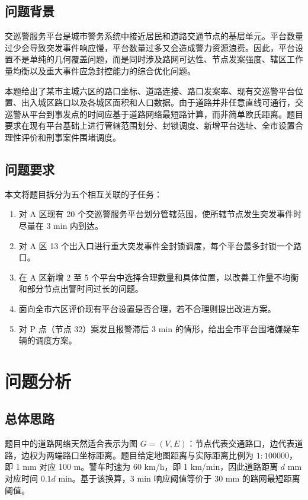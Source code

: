 \documentclass[UTF8,a4paper,12pt]{ctexart}
\begin{document}
\subsection{问题背景}
交巡警服务平台是城市警务系统中接近居民和道路交通节点的基层单元。平台数量过少会导致突发事件响应慢，平台数量过多又会造成警力资源浪费。因此，平台设置不是单纯的几何覆盖问题，而是同时涉及路网可达性、节点发案强度、辖区工作量均衡以及重大事件应急封控能力的综合优化问题。

本题给出了某市主城六区的路口坐标、道路连接、路口发案率、现有交巡警平台位置、出入城区路口以及各城区面积和人口数据。由于道路并非任意直线可通行，交巡警从平台到事发点的时间应基于道路网络最短路计算，而非简单欧氏距离。题目要求在现有平台基础上进行管辖范围划分、封锁调度、新增平台选址、全市设置合理性评价和刑事案件围堵调度。

\subsection{问题要求}
本文将题目拆分为五个相互关联的子任务：
\begin{enumerate}[label=\textbf{任务\arabic*：}]
  \item 对 A 区现有 20 个交巡警服务平台划分管辖范围，使所辖节点发生突发事件时尽量在 3 min 内到达。
  \item 对 A 区 13 个出入口进行重大突发事件全封锁调度，每个平台最多封锁一个路口。
  \item 在 A 区新增 2 至 5 个平台中选择合理数量和具体位置，以改善工作量不均衡和部分节点出警时间过长的问题。
  \item 面向全市六区评价现有平台设置是否合理，若不合理则提出改进方案。
  \item 对 P 点（节点 32）案发且报警滞后 3 min 的情形，给出全市平台围堵嫌疑车辆的调度方案。
\end{enumerate}

\section{问题分析}
\subsection{总体思路}
题目中的道路网络天然适合表示为图 $G=(V,E)$：节点代表交通路口，边代表道路，边权为两端路口坐标距离。题目给定地图距离与实际距离比例为 $1:100000$，即 1 mm 对应 100 m。警车时速为 60 km/h，即 1 km/min，因此道路距离 $d$ mm 对应时间 $0.1d$ min。基于该换算，3 min 响应阈值等价于 30 mm 的路网最短距离阈值。
\end{document}
